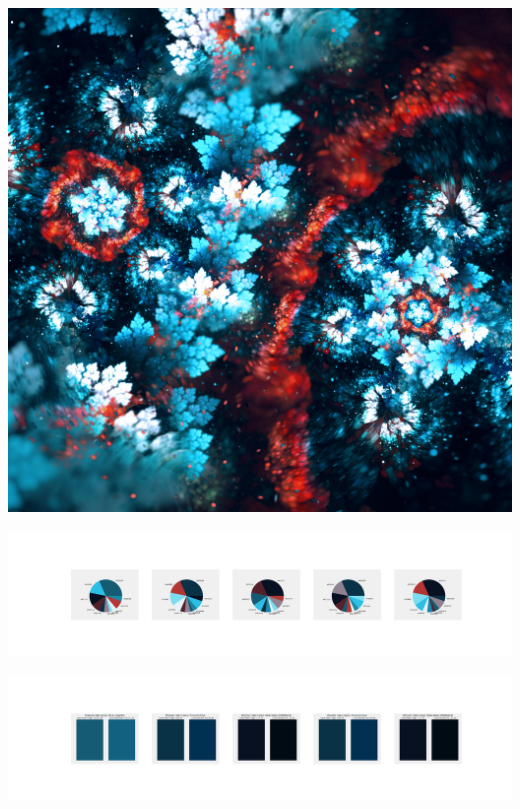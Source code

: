 \documentclass[11pt]{article}
\begin{document}
\begin{landscape}
    \begin{center}
    \includegraphics[width=\textwidth]{./nbimg/file (385).jpg}
    \end{center}

    \begin{center}
    \includegraphics[width=250mm]{./nbimg/pie-317.jpg}
    \end{center}

    \begin{center}
    \includegraphics[width=250mm]{./nbimg/peak-317.jpg}
    \end{center}
    


\end{landscape}
\end{document}
